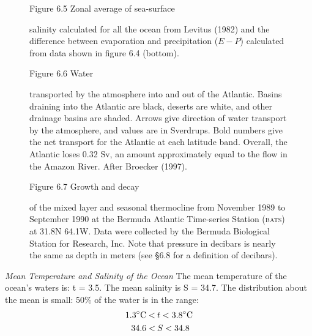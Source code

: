 \begin{figure}[t!]
\footnotesize
Figure 6.5 Zonal average of sea-surface \rule{0mm}{3ex}salinity calculated for all the ocean from Levitus (1982) and the difference between evaporation and precipitation ($E - P$) calculated from data shown in figure 6.4 (bottom).
\label{fig:zonalsalinity}
\vspace{-5ex}
\end{figure}

\begin{figure}[b!]
\vspace{-3ex}
\footnotesize
Figure 6.6 Water \rule{0pt}{3ex} transported by the atmosphere
into and out of the Atlantic. Basins draining into the Atlantic are black, deserts
are white, and other drainage basins are shaded. Arrows give direction of water
transport by the atmosphere, and values are in Sverdrups. Bold numbers give the
net transport for the Atlantic at each latitude band. Overall, the Atlantic loses 0.32 Sv, an
amount approximately equal to the flow in the Amazon River. After Broecker (1997).
\label{fig:BroeckerPlot}
\end{figure}

\begin{figure}[t!]
\footnotesize
Figure 6.7 Growth and decay \rule{0mm}{4ex} of the mixed layer and seasonal thermocline from November 1989 to
September 1990 at the Bermuda Atlantic Time-series Station (\textsc{bats}) at 31.8\degrees N
64.1\degrees W. Data were collected by the Bermuda Biological Station for Research, Inc. Note
that pressure in decibars is nearly the same as depth in meters (see \S 6.8 for a definition of
decibars).
\label{fig:seasonalthermo}
\vspace{-4ex}
\end{figure}

\textit{Mean Temperature and Salinity of the Ocean} The mean temperature of the ocean's
waters is: t = 3.5. The mean salinity is S = 34.7. The distribution about the mean
is small: 50\% of the water is in the range:
\begin{align}
1.3^{\circ}\text{C} < &\:t < 3.8^{\circ}\text{C} \notag \\
34.6 < &\:S < 34.8 \notag
\end{align}

